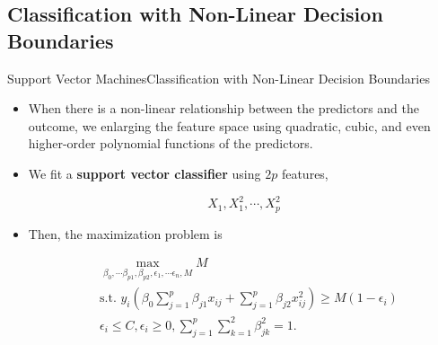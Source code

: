 \subsection{Classification with Non-Linear Decision Boundaries}

\begin{frame}{Support Vector Machines}{Classification with Non-Linear Decision Boundaries}
    
\begin{itemize}
    \item When there is a non-linear relationship between the predictors and the outcome, we enlarging the feature space using quadratic, cubic, and even higher-order polynomial functions of the predictors. \pause 

    \item We fit a \textbf{support vector classifier} using $2p$ features, \pause 

    \begin{equation*}
        X_1, X_1^2, \cdots, X_p^2
    \end{equation*} \pause 

    \item Then, the maximization problem is \pause 

    \begin{align}
        & \max_{\beta_0, \cdots \beta_{p1}, \beta_{p2}, \epsilon_1, \cdots \epsilon_n, M} M \\ 
        & \text{s.t. } y_i \left(  \beta_0 \sum_{j=1}^p \beta_{j1} x_{ij}  + \sum_{j=1}^p \beta_{j2} x^2_{ij}  \right) \geq M(1-\epsilon_i) \\
        & \epsilon_i \leq C, \epsilon_i \geq 0, \sum_{j=1}^p \sum_{k=1}^2 \beta_{jk}^2 = 1.  
    \end{align} 

    
\end{itemize}

\end{frame}


